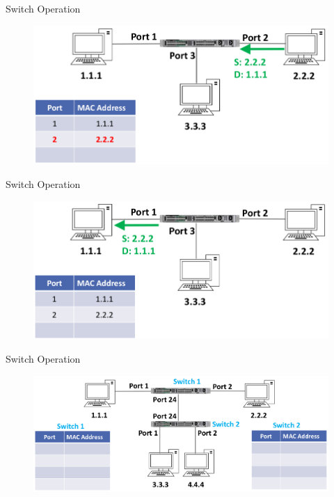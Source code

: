 \documentclass[pdflatex,compress,mathserif]{beamer}
\begin{document}
\begin{frame}{Switch Operation}
	\begin{figure}
		\centering
		\includegraphics[width=\linewidth]{img/img09}
	\end{figure}
\end{frame}

\begin{frame}{Switch Operation}
	\begin{figure}
		\centering
		\includegraphics[width=\linewidth]{img/img10}
	\end{figure}
\end{frame}

\begin{frame}{Switch Operation}
	\begin{figure}
		\centering
		\includegraphics[width=\linewidth]{img/img11}
	\end{figure}
\end{frame}
\end{document}

